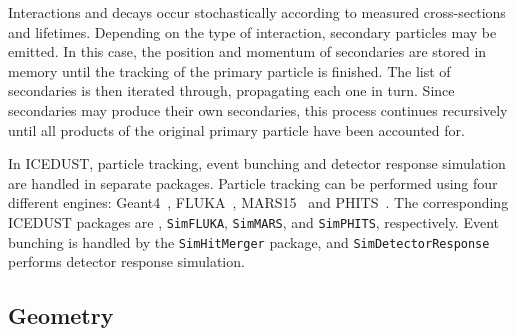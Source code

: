 Interactions and decays occur stochastically according to measured
cross-sections and lifetimes. Depending on the type of interaction, secondary
particles may be emitted. In this case, the position and momentum of secondaries
are stored in memory until the tracking of the primary particle is finished. The
list of secondaries is then iterated through, propagating each one in turn.
Since secondaries may produce their own secondaries, this process continues
recursively until all products of the original primary particle have been
accounted for.

In ICEDUST, particle tracking, event bunching and detector response simulation
are handled in separate packages. Particle tracking can be performed using four
different engines: Geant4~\cite{AGOSTINELLI2003250}, FLUKA~\cite{FLUKA},
MARS15~\cite{MARS15} and PHITS~\cite{PHITS}. The corresponding ICEDUST packages
are \SimG, \texttt{SimFLUKA}, \texttt{SimMARS}, and \texttt{SimPHITS},
respectively. Event bunching is handled by the \texttt{SimHitMerger} package,
and \texttt{SimDetectorResponse} performs detector response simulation.

\subsection{Geometry}

